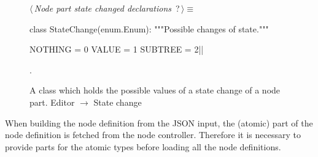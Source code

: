 \documentclass[%
    a4paper,    %
    justified,  %
    nobib,      %
    openany     %
]{tufte-book}
\begin{document}
\begin{figure}
\begin{flushleft} \small
\begin{minipage}{\linewidth}\label{scrap118}\raggedright\small
{} $\langle\,${\itshape Node part state changed declarations}\nobreak\ {\footnotesize {?}}$\,\rangle\equiv$
\vspace{-1ex}
\begin{pythoncode}
class StateChange(enum.Enum):
    """Possible changes of state."""

    NOTHING  = 0
    VALUE    = 1
    SUBTREE  = 2|\NWsep|
\end{pythoncode}
\vspace{1.5ex}
\footnotesize
\begin{list}{}{\setlength{\itemsep}{-\parsep}\setlength{\itemindent}{-\leftmargin}}
\item {\NWtxtMacroNoRef}.

\item{}
\end{list}
\end{minipage}\vspace{4ex}
\end{flushleft}
\caption{A class which holds the possible values of a state change of a node
  part.
  \newline{}\newline{}Editor $\rightarrow$ State change}
\label{editor:lst:state-change}
\end{figure}

 When building
the node definition from the JSON input, the (atomic) part of the node
definition is fetched from the node controller. Therefore it is necessary to
provide parts for the atomic types before loading all the node definitions.
\end{document}
